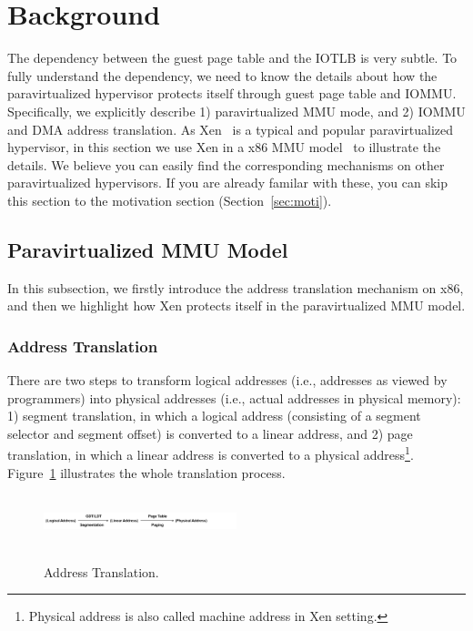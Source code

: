 \section{Background} \label{sec:background}
The dependency between the guest page table and the IOTLB is very subtle.
To fully understand the dependency, we need to know the details about how the paravirtualized hypervisor protects itself through guest page table and IOMMU.
Specifically, we explicitly describe 1) paravirtualized MMU mode, and 2) IOMMU and DMA address translation.
As Xen~\cite{XEN-SOSP03} is a typical and popular paravirtualized hypervisor, in this section we use Xen in a x86 MMU model~\cite{x86-pv-model} to illustrate the details. We believe you can easily find the corresponding mechanisms on other paravirtualized hypervisors.
If you are already familar with these, you can skip this section to the motivation section (Section~\ref{sec:moti}).



\subsection{Paravirtualized MMU Model}\label{sec:pvmodel}
In this subsection, we firstly introduce the address translation mechanism on x86, and then we highlight how Xen protects itself in the paravirtualized MMU model.

\subsubsection{Address Translation}\label{sec:addr-trans}
There are two steps to transform logical addresses (i.e., addresses as viewed by programmers) into physical addresses (i.e., actual addresses in physical memory):
1) segment translation, in which a logical address (consisting of a segment selector and segment offset) is converted to a linear address,
and 2) page translation, in which a linear address is converted to a physical address\footnote{Physical address is also called machine address in Xen setting.}.
Figure~\ref{fig:address-translation} illustrates the whole translation process.
\begin{figure}[ht]
\centering
\includegraphics[height=1.5cm, width=0.5\textwidth]{image/background/address-translation.png} \\
\caption{Address Translation.}
\label{fig:address-translation}
\end{figure}


